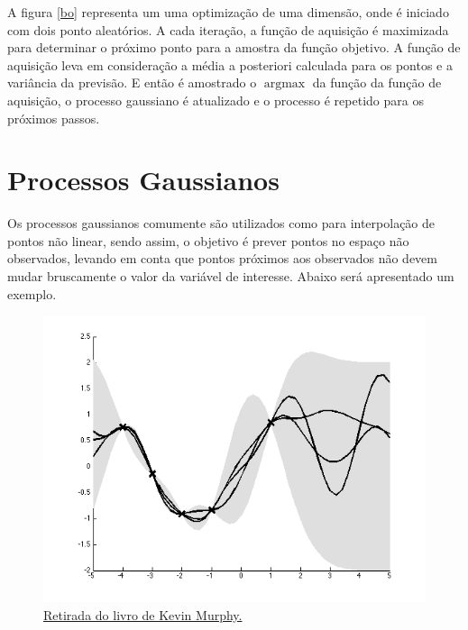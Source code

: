 \documentclass[
	12pt,				%
	a4paper,		%
	oneside,    %
	chapter=TITLE,		   %
	section=TITLE,		   %
	subsection=TITLE,	   %
	subsubsection=TITLE, %
	english,			%
	french,				%
	spanish,			%
	brazil,				%
]{abntex2}
\begin{document}
A figura \ref{bo} representa um uma optimização de uma dimensão, onde é
iniciado com dois ponto aleatórios. A cada iteração, a função de
aquisição é maximizada para determinar o próximo ponto para a amostra da
função objetivo. A função de aquisição leva em consideração a média a
posteriori calculada para os pontos e a variância da previsão. E então é
amostrado o \(\operatorname{argmax}\) da função da função de aquisição,
o processo gaussiano é atualizado e o processo é repetido para os
próximos passos.\\

\hypertarget{processos-gaussianos}{%
\section{Processos Gaussianos}\label{processos-gaussianos}}

Os processos gaussianos comumente são utilizados como para interpolação
de pontos não linear, sendo assim, o objetivo é prever pontos no espaço
não observados, levando em conta que pontos próximos aos observados não
devem mudar bruscamente o valor da variável de interesse. Abaixo será
apresentado um exemplo.\\

\begin{figure}
\centering
\includegraphics[width=\textwidth,height=0.3\textheight]{fig/gp.png}
\caption{\href{https://github.com/probml/pmtk3/blob/30d7a1952f3979b16e92dbfa4cd1ce0e402cf7d8/docs/demoOutput/bookDemos/(15)-Gaussian_processes/gprDemoNoiseFree_02.png}{Retirada
do livro de Kevin Murphy.\label{gp}}}
\end{figure}
\end{document}
